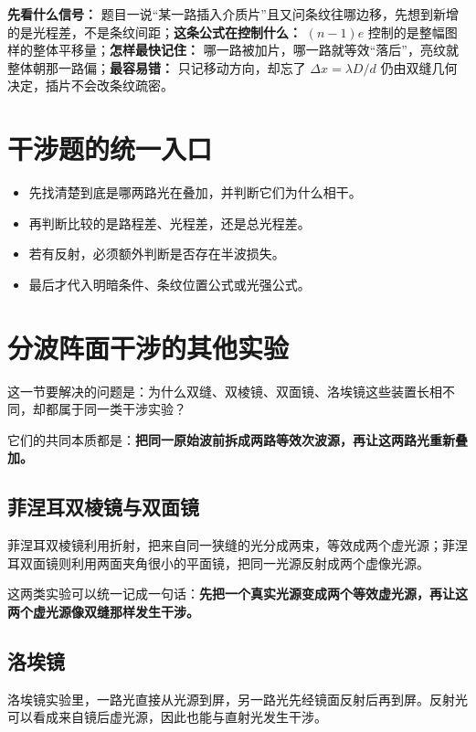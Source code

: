 \documentclass[lang=cn,11pt]{elegantbook}
\begin{document}
\begin{note}
\textbf{先看什么信号：} 题目一说“某一路插入介质片”且又问条纹往哪边移，先想到新增的是光程差，不是条纹间距；\textbf{这条公式在控制什么：} \((n-1)e\) 控制的是整幅图样的整体平移量；\textbf{怎样最快记住：} 哪一路被加片，哪一路就等效“落后”，亮纹就整体朝那一路偏；\textbf{最容易错：} 只记移动方向，却忘了 \(\Delta x=\lambda D/d\) 仍由双缝几何决定，插片不会改条纹疏密。
\end{note}

\section{干涉题的统一入口}

\begin{itemize}
  \item 先找清楚到底是哪两路光在叠加，并判断它们为什么相干。
  \item 再判断比较的是路程差、光程差，还是总光程差。
  \item 若有反射，必须额外判断是否存在半波损失。
  \item 最后才代入明暗条件、条纹位置公式或光强公式。
\end{itemize}

\section{分波阵面干涉的其他实验}

这一节要解决的问题是：为什么双缝、双棱镜、双面镜、洛埃镜这些装置长相不同，却都属于同一类干涉实验？

它们的共同本质都是：\textbf{把同一原始波前拆成两路等效次波源，再让这两路光重新叠加。}

\subsection{菲涅耳双棱镜与双面镜}

菲涅耳双棱镜利用折射，把来自同一狭缝的光分成两束，等效成两个虚光源；菲涅耳双面镜则利用两面夹角很小的平面镜，把同一光源反射成两个虚像光源。

这两类实验可以统一记成一句话：\textbf{先把一个真实光源变成两个等效虚光源，再让这两个虚光源像双缝那样发生干涉。}

\subsection{洛埃镜}

洛埃镜实验里，一路光直接从光源到屏，另一路光先经镜面反射后再到屏。反射光可以看成来自镜后虚光源，因此也能与直射光发生干涉。
\end{document}
